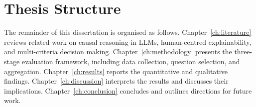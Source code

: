 \section{Thesis Structure}
\label{sec:intro-structure}

The remainder of this dissertation is organised as follows. Chapter~\ref{ch:literature}
reviews related work on causal reasoning in LLMs, human-centred explainability, and
multi-criteria decision making. Chapter~\ref{ch:methodology} presents the three-stage
evaluation framework, including data collection, question selection, and aggregation.
Chapter~\ref{ch:results} reports the quantitative and qualitative findings.
Chapter~\ref{ch:discussion} interprets the results and discusses their implications.
Chapter~\ref{ch:conclusion} concludes and outlines directions for future work.
